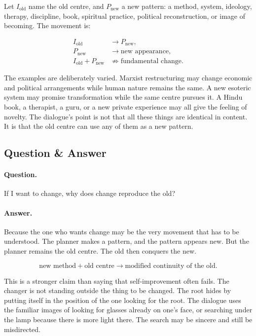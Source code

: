 \documentclass[11pt,oneside]{book}
\begin{document}
Let \(I_{\mathrm{old}}\) name the old centre, and \(P_{\mathrm{new}}\) a new pattern: a method, system, ideology, therapy, discipline, book, spiritual practice, political reconstruction, or image of becoming. The movement is:

\begin{align}
I_{\mathrm{old}} &\longrightarrow P_{\mathrm{new}},\\
P_{\mathrm{new}} &\longrightarrow \text{new appearance},\\
I_{\mathrm{old}} + P_{\mathrm{new}} &\not\Rightarrow \text{fundamental change}.
\end{align}

The examples are deliberately varied. Marxist restructuring may change economic and political arrangements while human nature remains the same. A new esoteric system may promise transformation while the same centre pursues it. A Hindu book, a therapist, a guru, or a new private experience may all give the feeling of novelty. The dialogue's point is not that all these things are identical in content. It is that the old centre can use any of them as a new pattern.

\subsection{Question \& Answer}

\paragraph{Question.}
If I want to change, why does change reproduce the old?

\paragraph{Answer.}
Because the one who wants change may be the very movement that has to be understood. The planner makes a pattern, and the pattern appears new. But the planner remains the old centre. The old then conquers the new.

\begin{equation}
\text{new method}
+
\text{old centre}
\longrightarrow
\text{modified continuity of the old}.
\end{equation}

This is a stronger claim than saying that self-improvement often fails. The changer is not standing outside the thing to be changed. The root hides by putting itself in the position of the one looking for the root. The dialogue uses the familiar images of looking for glasses already on one's face, or searching under the lamp because there is more light there. The search may be sincere and still be misdirected.
\end{document}
